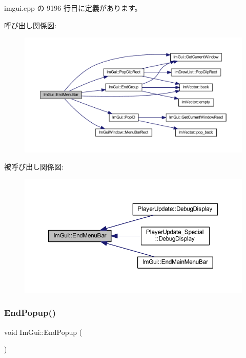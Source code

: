 imgui.\+cpp の 9196 行目に定義があります。

呼び出し関係図\+:\nopagebreak
\begin{figure}[H]
\begin{center}
\leavevmode
\includegraphics[width=350pt]{namespace_im_gui_aa226265c140eb6ee375c5b9abc69c4fc_cgraph}
\end{center}
\end{figure}
被呼び出し関係図\+:\nopagebreak
\begin{figure}[H]
\begin{center}
\leavevmode
\includegraphics[width=350pt]{namespace_im_gui_aa226265c140eb6ee375c5b9abc69c4fc_icgraph}
\end{center}
\end{figure}
\mbox{\label{namespace_im_gui_aa6a9b5696f2ea7eed7683425fc77b8f2}} 
\subsubsection{\texorpdfstring{End\+Popup()}{EndPopup()}}
{\footnotesize\ttfamily void Im\+Gui\+::\+End\+Popup (\begin{DoxyParamCaption}{ }\end{DoxyParamCaption})}




